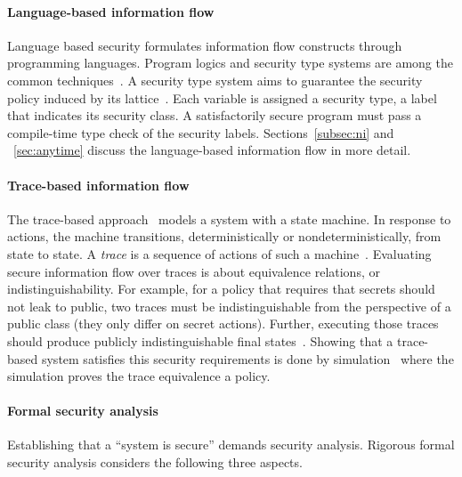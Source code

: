 \paragraph*{Language-based information flow}
Language based security formulates information flow constructs through programming languages.
Program logics and security type systems are among the common techniques~\cite{frumin2021}.
A security type system aims to guarantee the {security policy} induced by its {lattice}~\cite{marion2011}.
Each variable is assigned a {{security type}}, \ie a label that indicates its {security class}.
A satisfactorily secure program must pass a compile-time type check of the security labels.
Sections~\ref{subsec:ni} and ~\ref{sec:anytime} discuss the {language-based} information flow in more detail.

\paragraph*{Trace-based information flow}
The trace-based approach~\cite[p. 24]{eggert2014} models a system with a state machine.
In response to actions, the machine transitions, deterministically or nondeterministically, from state to state.
A \emph{trace} is a sequence of actions of such a machine~\cite{nelson2020}.
Evaluating secure information flow over traces is about equivalence relations, 
or {indistinguishability}.
For example, for a policy that requires that secrets should not leak to public, 
two traces must be indistinguishable from the perspective of a public class (they only differ on secret actions).
Further, executing those traces should produce publicly indistinguishable final states~\cite{nelson2020}.
Showing that a trace-based system satisfies this security requirements is done by {simulation}~\cite{piessens2024} 
where the simulation proves the trace equivalence \wrt a policy.

\paragraph*{Formal security analysis}
Establishing that a \enquote{system is secure} demands security analysis.
Rigorous formal security analysis considers the following three aspects.

